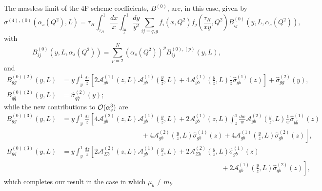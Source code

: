 \documentclass[12pt]{article}
\newcommand{\order}[1]{{\cal O}(#1)}
\begin{document}
\begin{appendix}
  The massless limit of the 4F scheme coefficients, $B^{(0)}$, are, in this case, given by
  \begin{equation}
    \label{eq:massless_lim}
    \sigma^{(4),(0)}\left(\alpha_s(Q^2),L\right)=\tau_H\int_{\tau_H}^{1} \frac{dx}{x}\int_{\frac{\tau_H}{x}}^{1} \frac{dy}
          {y^2}\sum_{ij=q,g}f_{i}(x,Q^2)f_j\left(\frac{\tau_H}{x y},Q^2\right)B_{ij}^{(0)}\left(y,L,\alpha_s(Q^2)\right),
  \end{equation}
  with
  \begin{equation}
    B_{ij}^{(0)}\left(y,L,\alpha_s(Q^2)\right) = \sum_{p=2}^N\left(\alpha_s(Q^2)\right)^pB_{ij}^{(0),(p)}\left(y,L\right),
  \end{equation}
  and
  \begin{align}
    B_{gg}^{(0)(2)} (y,L) & = y\int_y^1\frac{dz}{z}\left[2\mathcal{A}_{gb}^{(1)}\left(z,L\right)\mathcal{A}_{gb}^{(1)}\left(\frac{y}{z},L\right) + 4\mathcal{A}_{gb}^{(1)}\left(\frac{y}{z},L\right)\frac{1}{z}\hat{\sigma}_{gb}^{(1)}(z)\right] + \hat{\sigma}_{gg}^{(2)}(y), \\
    B_{q\bar{q}}^{(0)(2)} (y,L) &= \hat{\sigma}_{q\bar{q}}^{(2)}(y);
  \end{align}
  while the new contributions to  $\order{\alpha_s^3}$ are
  \begin{align}\label{eq:subtrexp}
    B_{gg}^{(0)(3)} (y,L) & = y\int_y^1\frac{dz}{z}\left[4\mathcal{A}_{gb}^{(2)}\left(z,L\right)\mathcal{A}_{gb}^{(1)}\left(\frac{y}{z},L\right) + 2\mathcal{A}_{gb}^{(1)}\left(z,L\right)\int_z^1\frac{dw}{w}\mathcal{A}_{gb}^{(2)}\left(\frac{y}{z},L\right)\frac{1}{w}\hat{\sigma}_{b\bar{b}}^{(1)}(z) \right.\nonumber \\
      & \left.\phantom{asdfdy\int_y^1\frac{dz}{z}4\mathcal{A}_{gb}^{(2)}\left(z,L\right)}+ 4\mathcal{A}_{gb}^{(2)}\left(\frac{y}{z},L\right)\hat{\sigma}_{gb}^{(1)}(z) + 4\mathcal{A}_{gb}^{(1)}\left(\frac{y}{z},L\right)\hat{\sigma}_{gb}^{(2)}(z)\right], \\
    B_{gq}^{(0)(3)} (y,L)  & =  y\int_y^1\frac{dz}{z}\left[2\mathcal{A}_{\Sigma b}^{(2)}\left(z,L\right)\mathcal{A}_{gb}^{(1)}\left(\frac{y}{z},L\right) + 2\mathcal{A}_{\Sigma b}^{(2)}\left(\frac{y}{z},L\right)\hat{\sigma}_{gb}^{(1)}(z) \right.\nonumber \\
      & \left.\phantom{asdfdy\int_y^1\frac{dz}{z}  4 \mathcal{A}_{gb}^{(2)}\left(z,L\right)\mathcal{A}_{gb}^{(1)}\left(\frac{y}{z},L\right)\mathcal{A}_{gb}^{(1)}\left(\frac{y}{z},L\right)}+ 2\mathcal{A}_{gb}^{(1)}\left(\frac{y}{z},L\right)\hat{\sigma}_{qb}^{(2)}(z)\right],
  \end{align}
  which completes our result in the case in which $\mu_b\neq m_b$.
\end{appendix}
\renewcommand{\em}{}


%
\end{document}
